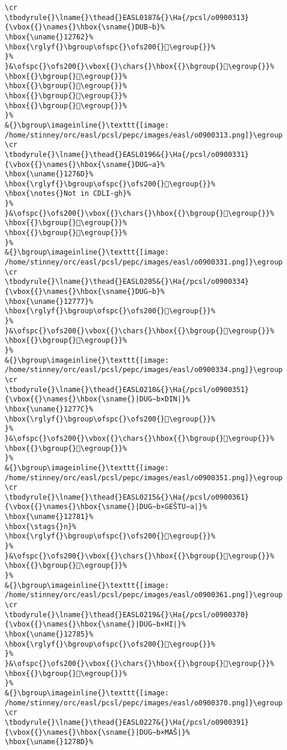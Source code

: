\begin{verbatim}
\cr
\tbodyrule{}\lname{}\thead{}EASL0187&{}\Ha{/pcsl/o0900313}{\vbox{{}\names{}\hbox{\sname{}DUB∼b}%
\hbox{\uname{}12762}%
\hbox{\rglyf{}\bgroup\ofspc{}\ofs200{}𒝢\egroup{}}%
}%
}&\ofspc{}\ofs200{}\vbox{{}\chars{}\hbox{{}\bgroup{}𒝡\egroup{}}%
\hbox{{}\bgroup{}𒝠\egroup{}}%
\hbox{{}\bgroup{}𒝣\egroup{}}%
\hbox{{}\bgroup{}𒝢\egroup{}}%
\hbox{{}\bgroup{}𒝤\egroup{}}%
}%
&{}\bgroup\imageinline{}\texttt{[image: /home/stinney/orc/easl/pcsl/pepc/images/easl/o0900313.png]}\egroup
\cr
\tbodyrule{}\lname{}\thead{}EASL0196&{}\Ha{/pcsl/o0900331}{\vbox{{}\names{}\hbox{\sname{}DUG∼a}%
\hbox{\uname{}1276D}%
\hbox{\rglyf{}\bgroup\ofspc{}\ofs200{}𒝭\egroup{}}%
\hbox{\notes{}Not in CDLI-gh}%
}%
}&\ofspc{}\ofs200{}\vbox{{}\chars{}\hbox{{}\bgroup{}𒝶\egroup{}}%
\hbox{{}\bgroup{}𒝵\egroup{}}%
\hbox{{}\bgroup{}𒝭\egroup{}}%
}%
&{}\bgroup\imageinline{}\texttt{[image: /home/stinney/orc/easl/pcsl/pepc/images/easl/o0900331.png]}\egroup
\cr
\tbodyrule{}\lname{}\thead{}EASL0205&{}\Ha{/pcsl/o0900334}{\vbox{{}\names{}\hbox{\sname{}DUG∼b}%
\hbox{\uname{}12777}%
\hbox{\rglyf{}\bgroup\ofspc{}\ofs200{}𒝷\egroup{}}%
}%
}&\ofspc{}\ofs200{}\vbox{{}\chars{}\hbox{{}\bgroup{}𒞭\egroup{}}%
\hbox{{}\bgroup{}𒝷\egroup{}}%
}%
&{}\bgroup\imageinline{}\texttt{[image: /home/stinney/orc/easl/pcsl/pepc/images/easl/o0900334.png]}\egroup
\cr
\tbodyrule{}\lname{}\thead{}EASL0210&{}\Ha{/pcsl/o0900351}{\vbox{{}\names{}\hbox{\sname{}|DUG∼b×DIN|}%
\hbox{\uname{}1277C}%
\hbox{\rglyf{}\bgroup\ofspc{}\ofs200{}𒝼\egroup{}}%
}%
}&\ofspc{}\ofs200{}\vbox{{}\chars{}\hbox{{}\bgroup{}𒞯\egroup{}}%
\hbox{{}\bgroup{}𒝼\egroup{}}%
}%
&{}\bgroup\imageinline{}\texttt{[image: /home/stinney/orc/easl/pcsl/pepc/images/easl/o0900351.png]}\egroup
\cr
\tbodyrule{}\lname{}\thead{}EASL0215&{}\Ha{/pcsl/o0900361}{\vbox{{}\names{}\hbox{\sname{}|DUG∼b×GEŠTU∼a|}%
\hbox{\uname{}12781}%
\hbox{\stags{}n}%
\hbox{\rglyf{}\bgroup\ofspc{}\ofs200{}𒞁\egroup{}}%
}%
}&\ofspc{}\ofs200{}\vbox{{}\chars{}\hbox{{}\bgroup{}𒞰\egroup{}}%
\hbox{{}\bgroup{}𒞁\egroup{}}%
}%
&{}\bgroup\imageinline{}\texttt{[image: /home/stinney/orc/easl/pcsl/pepc/images/easl/o0900361.png]}\egroup
\cr
\tbodyrule{}\lname{}\thead{}EASL0219&{}\Ha{/pcsl/o0900370}{\vbox{{}\names{}\hbox{\sname{}|DUG∼b×HI|}%
\hbox{\uname{}12785}%
\hbox{\rglyf{}\bgroup\ofspc{}\ofs200{}𒞅\egroup{}}%
}%
}&\ofspc{}\ofs200{}\vbox{{}\chars{}\hbox{{}\bgroup{}𒞱\egroup{}}%
\hbox{{}\bgroup{}𒞅\egroup{}}%
}%
&{}\bgroup\imageinline{}\texttt{[image: /home/stinney/orc/easl/pcsl/pepc/images/easl/o0900370.png]}\egroup
\cr
\tbodyrule{}\lname{}\thead{}EASL0227&{}\Ha{/pcsl/o0900391}{\vbox{{}\names{}\hbox{\sname{}|DUG∼b×MAŠ|}%
\hbox{\uname{}1278D}%

\end{verbatim}
